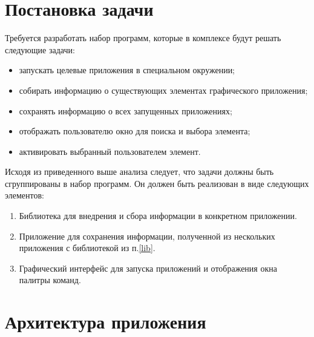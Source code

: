 \section{Постановка задачи}

Требуется разработать набор программ, которые в комплексе будут решать следующие
задачи:

\begin{itemize}
	\item запускать целевые приложения в специальном окружении;
	\item собирать информацию о существующих элементах графического приложения;
	\item сохранять информацию о всех запущенных приложениях;
	\item отображать пользователю окно для поиска и выбора элемента;
	\item активировать выбранный пользователем элемент.
\end{itemize}

Исходя из приведенного выше анализа следует, что задачи должны быть сгруппированы
в набор программ. Он должен быть реализован в виде следующих элементов:

\begin{enumerate}
	\item\label{lib} Библиотека для внедрения и сбора информации в конкретном
		приложении.
	\item Приложение для сохранения информации, полученной из нескольких
		приложения с библиотекой из п.\ref{lib}.
	\item Графический интерфейс для запуска приложений и отображения окна
		палитры команд.
\end{enumerate}

\section{Архитектура приложения}

